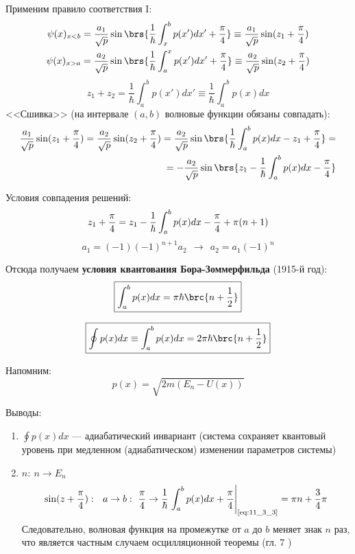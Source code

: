 Применим правило соответствия I:
$$
\begin{gathered}
\psi(x)_{x<b} = \frac{a_1}{\sqrt{p}} \sin\brs{\frac{1}{\hbar} \int_{x}^{b} p(x')dx' + \frac{\pi}{4} } \equiv \frac{a_1}{\sqrt{p}} \sin({z_1 + \frac{\pi}{4}}) \\
\psi(x)_{x>a} = \frac{a_2}{\sqrt{p}} \sin\brs{\frac{1}{\hbar} \int_{a}^{x} p(x')dx' + \frac{\pi}{4} } \equiv \frac{a_2}{\sqrt{p}} \sin({z_2 + \frac{\pi}{4}})
\end{gathered}
$$
$$
z_1+z_2 = \frac{1}{\hbar} \int_{a}^{b} p(x')dx' \equiv \frac{1}{\hbar} \int_{a}^{b} p(x)dx
$$
<<Сшивка>> (на интервале $(a, b)$ волновые функции обязаны совпадать):
$$
\begin{aligned}
\frac{a_1}{\sqrt{p}} \sin({z_1+\frac{\pi}{4}}) = \frac{a_2}{\sqrt{p}} \sin({z_2+\frac{\pi}{4}}) = \frac{a_2}{\sqrt{p}} \sin\brs{\frac{1}{\hbar} \int_{a}^{b} p(x)dx - z_1 + \frac{\pi}{4}} = \\
= -\frac{a_2}{\sqrt{p}} \sin\brs{z_1 - \frac{1}{\hbar} \int_{a}^{b} p(x)dx - \frac{\pi}{4} }
\end{aligned}
$$

Условия совпадения решений:
\begin{equation}
\label{eq:11_3_1}
z_1 + \frac{\pi}{4} = z_1 - \frac{1}{\hbar} \int_{a}^{b} p(x)dx - \frac{\pi}{4} + \pi(n+1) \\
\end{equation}
\begin{equation}
\label{eq:11_3_2}
a_1 = (-1)(-1)^{n+1}a_2  ~~\rightarrow~~ a_2 = a_1 (-1)^n
\end{equation}

Отсюда получаем \textbf{условия квантования Бора-Зоммерфильда} (1915-й год):
\begin{equation}
\label{eq:11_3_3}
\boxed{\int_{a}^{b} p(x)dx = \pi\hbar\brc{n+\frac{1}{2}}}
\end{equation}

\begin{equation}
\label{eq:11_3_4}
\boxed{\oint p(x)dx \equiv \int_{a}^{b} p(x)dx = 2\pi\hbar\brc{n+\frac{1}{2}}}
\end{equation}

Напомним:
$$
p(x) = \sqrt{2m(E_n - U(x))}
$$

Выводы:
\begin{enumerate}
\item $\oint p(x)dx $ --- адиабатический инвариант (система сохраняет квантовый уровень при медленном (адиабатическом) изменении параметров системы)
\item $n:~ n \to E_n$
$$
\sin({z+\frac{\pi}{4}}):~~ a \to b:~ \frac{\pi}{4} \to \frac{1}{\hbar} \left. \int_{a}^{b} p(x)dx + \frac{\pi}{4} \right|_{\text{\eqref{eq:11_3_3}}} =
\pi n + \frac{3}{4}\pi
$$
Следовательно, волновая функция на промежутке от $a$ до $b$ меняет знак $n$ раз, что является частным случаем осцилляционной теоремы (гл. 7 )
\end{enumerate}


